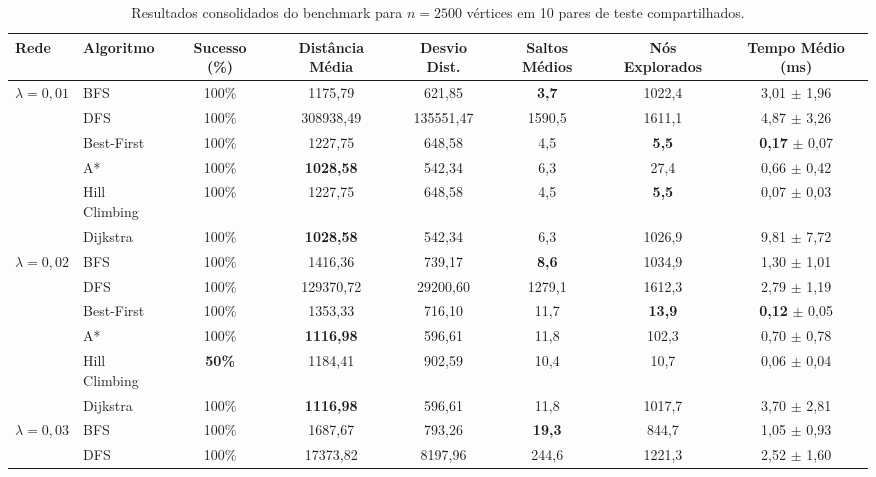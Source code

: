 \documentclass[a4paper,10pt,twocolumn]{article}
\begin{document}
\begin{table}[!t]
\centering
\caption{Resultados consolidados do benchmark para $n = 2500$ vértices em 10 pares de teste compartilhados.}
\label{tab:benchmark_estatisticas}
\small
\begin{tabular}{llcccccc}
\toprule
\textbf{Rede} & \textbf{Algoritmo} & \textbf{Sucesso (\%)} & \textbf{Distância Média} & \textbf{Desvio Dist.} & \textbf{Saltos Médios} & \textbf{Nós Explorados} & \textbf{Tempo Médio (ms)} \\
\midrule
\multirow{6}{*}{\textbf{$\lambda = 0{,}01$}} 
 & BFS           & 100\% & 1175{,}79 & 621{,}85 & \textbf{3{,}7}  & 1022{,}4 & 3{,}01 $\pm$ 1{,}96 \\
 & DFS           & 100\% & 308938{,}49 & 135551{,}47 & 1590{,}5 & 1611{,}1 & 4{,}87 $\pm$ 3{,}26 \\
 & Best-First    & 100\% & 1227{,}75 & 648{,}58 & 4{,}5  & \textbf{5{,}5}   & \textbf{0{,}17} $\pm$ 0{,}07 \\
 & A*            & 100\% & \textbf{1028{,}58} & 542{,}34 & 6{,}3  & 27{,}4  & 0{,}66 $\pm$ 0{,}42 \\
 & Hill Climbing & 100\% & 1227{,}75 & 648{,}58 & 4{,}5  & \textbf{5{,}5}   & 0{,}07 $\pm$ 0{,}03 \\
 & Dijkstra      & 100\% & \textbf{1028{,}58} & 542{,}34 & 6{,}3  & 1026{,}9 & 9{,}81 $\pm$ 7{,}72 \\
\midrule
\multirow{6}{*}{\textbf{$\lambda = 0{,}02$}} 
 & BFS           & 100\% & 1416{,}36 & 739{,}17 & \textbf{8{,}6}  & 1034{,}9 & 1{,}30 $\pm$ 1{,}01 \\
 & DFS           & 100\% & 129370{,}72 & 29200{,}60 & 1279{,}1 & 1612{,}3 & 2{,}79 $\pm$ 1{,}19 \\
 & Best-First    & 100\% & 1353{,}33 & 716{,}10 & 11{,}7 & \textbf{13{,}9}  & \textbf{0{,}12} $\pm$ 0{,}05 \\
 & A*            & 100\% & \textbf{1116{,}98} & 596{,}61 & 11{,}8 & 102{,}3 & 0{,}70 $\pm$ 0{,}78 \\
 & Hill Climbing & \textbf{50\%}  & 1184{,}41 & 902{,}59 & 10{,}4 & 10{,}7  & 0{,}06 $\pm$ 0{,}04 \\
 & Dijkstra      & 100\% & \textbf{1116{,}98} & 596{,}61 & 11{,}8 & 1017{,}7 & 3{,}70 $\pm$ 2{,}81 \\
\midrule
\multirow{6}{*}{\textbf{$\lambda = 0{,}03$}} 
 & BFS           & 100\% & 1687{,}67 & 793{,}26 & \textbf{19{,}3} & 844{,}7  & 1{,}05 $\pm$ 0{,}93 \\
 & DFS           & 100\% & 17373{,}82  & 8197{,}96  & 244{,}6 & 1221{,}3 & 2{,}52 $\pm$ 1{,}60 \\

\end{tabular}
\end{table}
\end{document}
